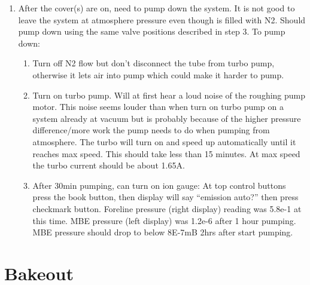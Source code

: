 \begin{enumerate}
\item	 After the cover(s) are on, need to pump down the system. It is not good to leave the system at atmosphere pressure even though is filled with N2. Should pump down using the same valve positions described in step 3. To pump down:
\begin{enumerate}
\item	Turn off N2 flow but don’t disconnect the tube from turbo pump, otherwise it lets air into pump which could make it harder to pump. 
\item	Turn on turbo pump. Will at first hear a loud noise of the roughing pump motor. This noise seems louder than when turn on turbo pump on a system already at vacuum but is probably because of the higher pressure difference/more work the pump needs to do when pumping from atmosphere. The turbo will turn on and speed up automatically until it reaches max speed. This should take less than 15 minutes. At max speed the turbo current should be about 1.65A.
\item	After 30min pumping, can turn on ion gauge: At top control buttons press the book button, then display will say “emission auto?” then press checkmark button. Foreline pressure (right display) reading was 5.8e-1 at this time. MBE pressure (left display) was 1.2e-6 after 1 hour pumping. MBE pressure should drop to below 8E-7mB 2hrs after start pumping.
\end{enumerate}
\end{enumerate}


\section{Bakeout}
